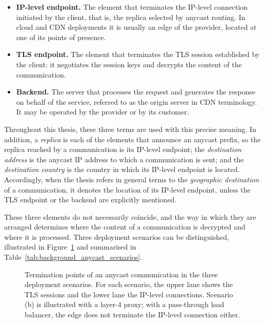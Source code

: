 \begin{itemize}
    \item \textbf{IP-level endpoint.} The element that terminates the IP-level connection initiated by the client, that is, the replica selected by anycast routing. In cloud and CDN deployments it is usually an edge of the provider, located at one of its points of presence.

    \item \textbf{TLS endpoint.} The element that terminates the TLS session established by the client: it negotiates the session keys and decrypts the content of the communication.

    \item \textbf{Backend.} The server that processes the request and generates the response on behalf of the service, referred to as the origin server in CDN terminology. It may be operated by the provider or by its customer.
\end{itemize}

Throughout this thesis, these three terms are used with this precise meaning. In addition, a \textit{replica} is each of the elements that announce an anycast prefix, so the replica reached by a communication is its IP-level endpoint; the \textit{destination address} is the anycast IP address to which a communication is sent; and the \textit{destination country} is the country in which its IP-level endpoint is located. Accordingly, when the thesis refers in general terms to the \textit{geographic destination} of a communication, it denotes the location of its IP-level endpoint, unless the TLS endpoint or the backend are explicitly mentioned.

These three elements do not necessarily coincide, and the way in which they are arranged determines where the content of a communication is decrypted and where it is processed. Three deployment scenarios can be distinguished, illustrated in Figure~\ref{fig:background_anycast_scenarios} and summarised in Table~\ref{tab:background_anycast_scenarios}.

\begin{figure}[ht]
    \centering
    \resizebox{\textwidth}{!}{}
    \caption{Termination points of an anycast communication in the three deployment scenarios. For each scenario, the upper lane shows the TLS sessions and the lower lane the IP-level connections. Scenario (b) is illustrated with a layer-4 proxy; with a pass-through load balancer, the edge does not terminate the IP-level connection either.}
    \label{fig:background_anycast_scenarios}
\end{figure}

